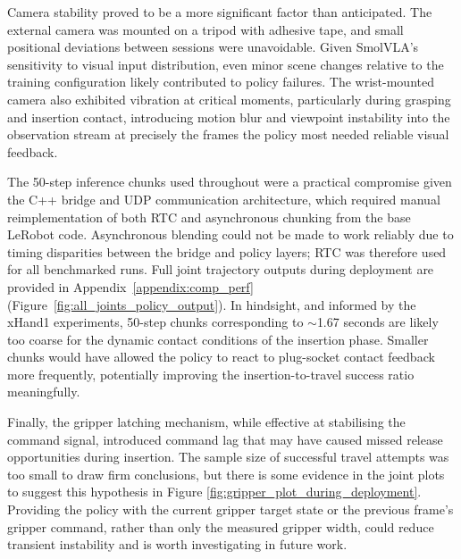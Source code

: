 \documentclass[conference]{IEEEtran}
\begin{document}

Camera stability proved to be a more significant factor than anticipated. The external camera was mounted on a tripod with adhesive tape, and small positional deviations between sessions were unavoidable. Given SmolVLA's sensitivity to visual input distribution, even minor scene changes relative to the training configuration likely contributed to policy failures. The wrist-mounted camera also exhibited vibration at critical moments, particularly during grasping and insertion contact, introducing motion blur and viewpoint instability into the observation stream at precisely the frames the policy most needed reliable visual feedback.


The 50-step inference chunks used throughout were a practical compromise given the C++ bridge and UDP communication architecture, which required manual reimplementation of both RTC and asynchronous chunking from the base LeRobot code. Asynchronous blending could not be made to work reliably due to timing disparities between the bridge and policy layers; RTC was therefore used for all benchmarked runs. Full joint trajectory outputs during deployment are provided in Appendix~\ref{appendix:comp_perf} (Figure~\ref{fig:all_joints_policy_output}). In hindsight, and informed by the xHand1 experiments, 50-step chunks corresponding to $\sim$1.67 seconds are likely too coarse for the dynamic contact conditions of the insertion phase. Smaller chunks would have allowed the policy to react to plug-socket contact feedback more frequently, potentially improving the insertion-to-travel success ratio meaningfully.


Finally, the gripper latching mechanism, while effective at stabilising the command signal, introduced command lag that may have caused missed release opportunities during insertion. The sample size of successful travel attempts was too small to draw firm conclusions, but there is some evidence in the joint plots to suggest this hypothesis in Figure \ref{fig:gripper_plot_during_deployment}. Providing the policy with the current gripper target state or the previous frame's gripper command, rather than only the measured gripper width, could reduce transient instability and is worth investigating in future work.
\end{document}

